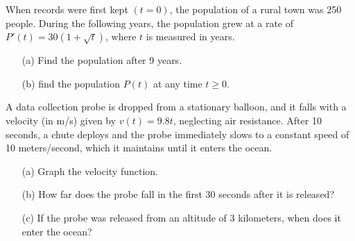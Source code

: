 \documentclass[12pt]{article}
\begin{document}
\newpage

\Example When records were first kept $(t=0)$, the population of a rural town was 250 people. During the following years, the population grew at a rate of $P'(t)=30\left(1+\sqrt{t}\right)$, where $t$ is measured in years.

\begin{enumerate}
\item[(a)] Find the population after 9 years.

\vspace{80mm}

\item[(b)] find the population $P(t)$ at any time $t\geq 0$.
\end{enumerate}

\newpage

\Example A data collection probe is dropped from a stationary balloon, and it falls with a velocity (in m/s) given by $v(t)=9.8t$, neglecting air resistance. After 10 seconds, a chute deploys and the probe immediately slows to a constant speed of 10 meters/second, which it maintains until it enters the ocean.

\begin{enumerate}
\item[(a)] Graph the velocity function.

\vspace{50mm}

\item[(b)] How far does the probe fall in the first 30 seconds after it is released?

\vspace{50mm}

\item[(c)] If the probe was released from an altitude of 3 kilometers, when does it enter the ocean?
\end{enumerate}
\end{document}
